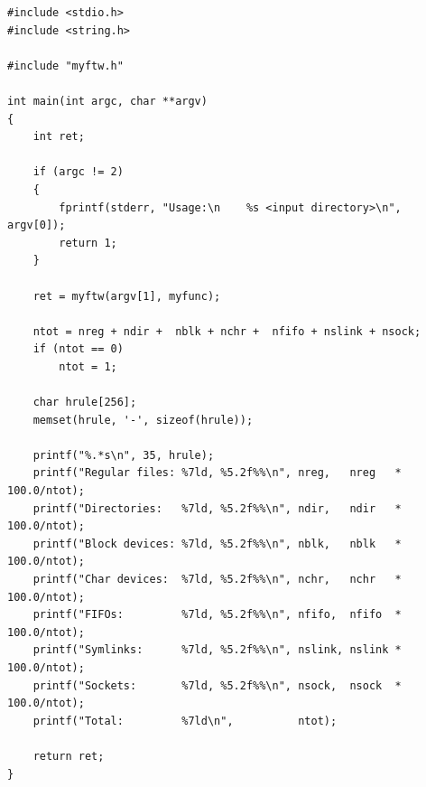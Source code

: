 \begin{lstlisting}[caption={Функция main}]
#include <stdio.h>
#include <string.h>

#include "myftw.h"

int main(int argc, char **argv)
{
    int ret;

    if (argc != 2)
    {
        fprintf(stderr, "Usage:\n    %s <input directory>\n", argv[0]);
        return 1;
    }

    ret = myftw(argv[1], myfunc);

    ntot = nreg + ndir +  nblk + nchr +  nfifo + nslink + nsock;
    if (ntot == 0)
        ntot = 1;

    char hrule[256];
    memset(hrule, '-', sizeof(hrule));

    printf("%.*s\n", 35, hrule);
    printf("Regular files: %7ld, %5.2f%%\n", nreg,   nreg   * 100.0/ntot);
    printf("Directories:   %7ld, %5.2f%%\n", ndir,   ndir   * 100.0/ntot);
    printf("Block devices: %7ld, %5.2f%%\n", nblk,   nblk   * 100.0/ntot);
    printf("Char devices:  %7ld, %5.2f%%\n", nchr,   nchr   * 100.0/ntot);
    printf("FIFOs:         %7ld, %5.2f%%\n", nfifo,  nfifo  * 100.0/ntot);
    printf("Symlinks:      %7ld, %5.2f%%\n", nslink, nslink * 100.0/ntot);
    printf("Sockets:       %7ld, %5.2f%%\n", nsock,  nsock  * 100.0/ntot);
    printf("Total:         %7ld\n",          ntot);

    return ret;
}
\end{lstlisting}
